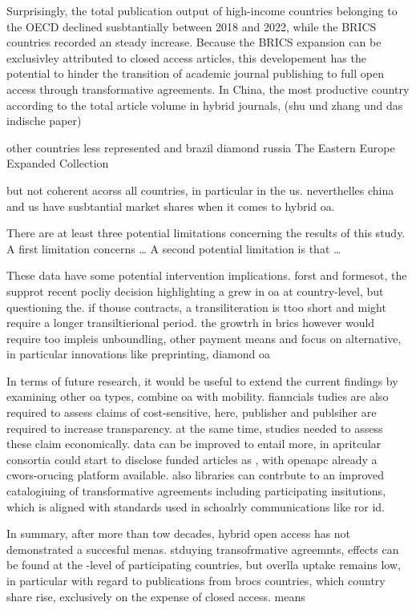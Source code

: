 \documentclass[a4paper,man,floatsintext,longtable,noextraspace,12pt]{apa6}
\begin{document}
Surprisingly, the total publication output of high-income countries
belonging to the OECD declined susbtantially between 2018 and 2022,
while the BRICS countries recorded an steady increase. Because the BRICS
expansion can be exclusivley attributed to closed access articles, this
developement has the potential to hinder the transition of academic
journal publishing to full open access through transformative
agreements. In China, the most productive country according to the total
article volume in hybrid journals, (shu und zhang und das indische
paper)

other countries less represented and brazil diamond russia The Eastern
Europe Expanded Collection

but not coherent acorss all countries, in particular in the us.
neverthelles china and us have susbtantial market shares when it comes
to hybrid oa.

There are at least three potential limitations concerning the results of
this study. A first limitation concerns \ldots{} A second potential
limitation is that \ldots{}

These data have some potential intervention implications. forst and
formesot, the supprot recent pocliy decision highlighting a grew in oa
at country-level, but questioning the. if thouse contracts, a
transiliteration is ttoo short and might require a longer
transiltierional period. the growtrh in brics however would require too
impleis unboundling, other payment means and focus on alternative, in
particular innovations like preprinting, diamond oa

In terms of future research, it would be useful to extend the current
findings by examining other oa types, combine oa with mobility.
fianncials tudies are also required to assess claims of cost-sensitive,
here, publisher and publsiher are required to increase transparency. at
the same time, studies needed to assess these claim economically. data
can be improved to entail more, in apritcular consortia could start to
disclose funded articles as , with openapc already a cwors-orucing
platform available. also libraries can contrbute to an improved
catalogiuing of transformative agreements including participating
insitutions, which is aligned with standards used in schoalrly
communications like ror id.

In summary, after more than tow decades, hybrid open access has not
demonstrated a succesful menas. stduying transofrmative agreemnts,
effects can be found at the -level of participating countries, but
overlla uptake remains low, in particular with regard to publications
from brocs countries, which country share rise, exclusively on the
expense of closed access. means
\end{document}
